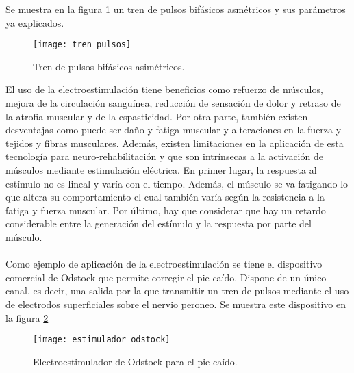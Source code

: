 Se muestra en la figura \ref{fig:tren_pulsos} un tren de pulsos bifásicos asmétricos y sus parámetros ya explicados.\\

\begin{figure}[!htb]
\centering
\texttt{[image: tren\_pulsos]}
  \caption{Tren de pulsos bifásicos asimétricos.}\label{fig:tren_pulsos}
\end{figure}


El uso de la electroestimulación tiene beneficios como refuerzo de músculos, mejora de la circulación sanguínea, reducción de sensación de dolor y retraso de la atrofia muscular y de la espasticidad\cite{ventajas_FES}. Por otra parte, también existen desventajas como puede ser daño y fatiga muscular y alteraciones en la fuerza y tejidos y fibras musculares\cite{electroestimulacion}. Además, existen limitaciones en la aplicación de esta tecnología para neuro-rehabilitación y que son intrínsecas a la activación de músculos mediante estimulación eléctrica. En primer lugar, la respuesta al estímulo no es lineal y varía con el tiempo. Además, el músculo se va fatigando lo que altera su comportamiento el cual también varía según la resistencia a la fatiga y fuerza muscular. Por último, hay que considerar que hay un retardo considerable entre la generación del estímulo y  la respuesta por parte del músculo\cite{limitaciones_fes}.
\\
\\
Como ejemplo de aplicación de la electroestimulación se tiene el dispositivo comercial de Odstock\cite{estimulador_odstock} que permite corregir el pie caído\cite{pie_caido}. Dispone de un único canal, es decir, una salida por la que transmitir un tren de pulsos mediante el uso de electrodos superficiales sobre el nervio peroneo. Se muestra este dispositivo en la figura \ref{fig:estimulador_odstock}\\

\begin{figure}[!htb]
\centering
\texttt{[image: estimulador\_odstock]}
  \caption{Electroestimulador de Odstock para el pie caído.}\label{fig:estimulador_odstock}
\end{figure}



